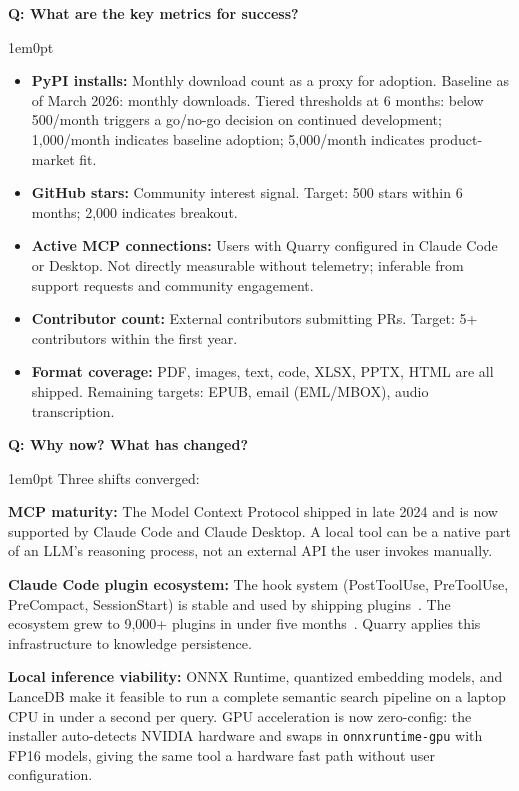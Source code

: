 \documentclass[11pt,letterpaper]{article}
\newcounter{faqnum}
\newenvironment{faqpair}[1]{%
  \needspace{4\baselineskip}%
  \vspace{0.5em}%
  \refstepcounter{faqnum}%
  \noindent\textbf{\color{SectionBlue}Q\thefaqnum: #1}\par\nopagebreak[4]%
  \vspace{0.2em}%
  \begin{adjustwidth}{1em}{0pt}%
  \setlength{\parindent}{0pt}%
}{%
  \end{adjustwidth}%
  \vspace{0.5em}%
}
\begin{document}
\begin{faqpair}{What are the key metrics for success?}\label{faq:metrics}
  \begin{itemize}[leftmargin=1.5em, nosep]
    \item \textbf{PyPI installs:} Monthly download count as a proxy for adoption.
          Baseline as of March 2026:  monthly downloads.
          Tiered thresholds at 6 months: below 500/month triggers a go/no-go
          decision on continued development; 1{,}000/month indicates baseline
          adoption; 5{,}000/month indicates product-market fit.
    \item \textbf{GitHub stars:} Community interest signal.
          Target: 500 stars within 6 months; 2{,}000 indicates breakout.
    \item \textbf{Active MCP connections:} Users with Quarry configured in Claude
          Code or Desktop. Not directly measurable without telemetry; inferable
          from support requests and community engagement.
    \item \textbf{Contributor count:} External contributors submitting PRs.
          Target: 5+ contributors within the first year.
    \item \textbf{Format coverage:} PDF, images, text, code, XLSX, PPTX, HTML
          are all shipped. Remaining targets: EPUB, email (EML/MBOX), audio
          transcription.
  \end{itemize}
\end{faqpair}

\begin{faqpair}{Why now? What has changed?}\label{faq:why-now}
  Three shifts converged:

  \textbf{MCP maturity:} The Model Context Protocol shipped in late 2024 and is
  now supported by Claude Code and Claude Desktop. A local tool can be a native
  part of an LLM's reasoning process, not an external API the user invokes
  manually.

  \textbf{Claude Code plugin ecosystem:} The hook system (PostToolUse,
  PreToolUse, PreCompact, SessionStart) is stable and used by shipping
  plugins~\cite{claude-code-hooks}. The ecosystem grew to 9{,}000+ plugins in
  under five months~\cite{startuphub2025claudeplugins}. Quarry applies this
  infrastructure to knowledge persistence.

  \textbf{Local inference viability:} ONNX Runtime, quantized embedding models,
  and LanceDB make it feasible to run a complete semantic search pipeline on a
  laptop CPU in under a second per query. GPU acceleration is now zero-config:
  the installer auto-detects NVIDIA hardware and swaps in
  \texttt{onnxruntime-gpu} with FP16 models, giving the same tool a hardware
  fast path without user configuration.
\end{faqpair}
\end{document}
